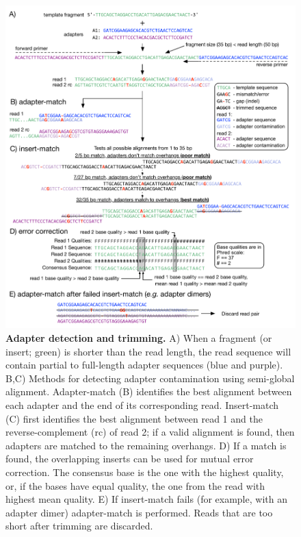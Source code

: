 \documentclass[fleqn,10pt,lineno]{wlpeerj} %
\begin{document}
\begin{figure}[!ht]
\centering
\includegraphics[width=\linewidth]{Figure1.pdf}
\caption{\textbf{Adapter detection and trimming.} A) When a fragment (or insert; green) is shorter than the read length, the read sequence will contain partial to full-length adapter sequences (blue and purple). B,C) Methods for detecting adapter contamination using semi-global alignment. Adapter-match (B) identifies the best alignment between each adapter and the end of its corresponding read. Insert-match (C) first identifies the best alignment between read 1 and the reverse-complement (rc) of read 2; if a valid alignment is found, then adapters are matched to the remaining overhangs. D) If a match is found, the overlapping inserts can be used for mutual error correction. The consensus base is the one with the highest quality, or, if the bases have equal quality, the one from the read with highest mean quality. E) If insert-match fails (for example, with an adapter dimer) adapter-match is performed. Reads that are too short after trimming are discarded.}
\label{fig:overview}
\end{figure}
\end{document}

